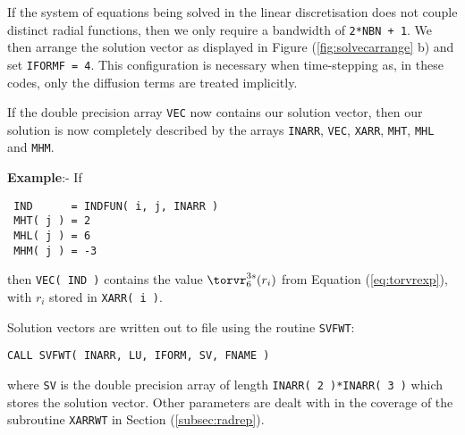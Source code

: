 If the system
of equations being solved in the linear discretisation
does not couple distinct radial functions, then we
only require a bandwidth of \verb.2*NBN + 1.. We
then arrange the solution vector as displayed in
Figure (\ref{fig:solvecarrange} b)
and set \verb+IFORMF = 4+.
This configuration is necessary when time-stepping
as, in these codes, only the diffusion terms are
treated implicitly.

If the double precision array \verb+VEC+ now contains
our solution vector, then our solution
is now completely described by the arrays
\verb+INARR+,
\verb+VEC+,
\verb+XARR+,
\verb+MHT+,
\verb+MHL+ and
\verb+MHM+. \newline

{\bf Example}:- \newline
If \begin{verbatim}
 IND      = INDFUN( i, j, INARR )
 MHT( j ) = 2
 MHL( j ) = 6
 MHM( j ) = -3
\end{verbatim}
then \verb+VEC( IND )+ contains the value
${\torvr}_6^{3s}( r_i )$ from Equation
(\ref{eq:torvrexp}), with $r_i$ stored in \verb+XARR( i )+. \newline

Solution vectors are written out to file using the routine
\verb+SVFWT+:
\begin{verbatim}
CALL SVFWT( INARR, LU, IFORM, SV, FNAME )
\end{verbatim}
where \verb+SV+ is the double precision array of
length \verb+INARR( 2 )*INARR( 3 )+
which stores the solution vector. Other parameters
are dealt with in the coverage of the subroutine
\verb+XARRWT+ in Section (\ref{subsec:radrep}).

